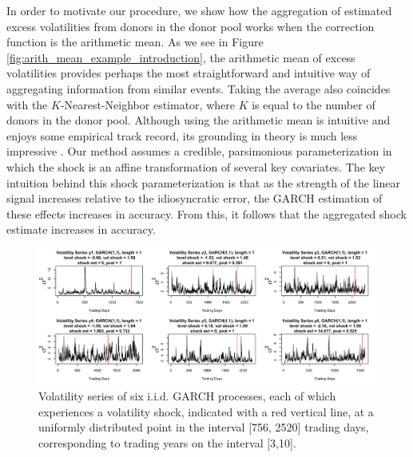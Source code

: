 \documentclass[11pt,3p,review,authoryear]{elsarticle}
\theoremstyle{definition}
\begin{document}
In order to motivate our procedure, we show how the aggregation of estimated excess volatilities from donors in the donor pool works when the correction function is the arithmetic mean.  As we see in Figure \ref{fig:arith_mean_example_introduction}, the arithmetic mean of excess volatilities provides perhaps the most straightforward and intuitive way of aggregating information from similar events.  Taking the average also coincides with the $K$-Nearest-Neighbor estimator, where $K$ is equal to the number of donors in the donor pool. Although using the arithmetic mean is intuitive and enjoys some empirical track record, its grounding in theory is much less impressive \citep{timmermann2006forecast}.  Our method assumes a credible, parsimonious parameterization in which the shock is an affine transformation of several key covariates.  The key intuition behind this shock parameterization is that as the strength of the linear signal increases relative to the idiosyncratic error, the GARCH estimation of these effects increases in accuracy.  From this, it follows that the aggregated shock estimate increases in accuracy.

\begin{figure}[h]
  \begin{center}
    \includegraphics[scale=.4]{simulation_plots/vol_series_six_plots.png}
    \caption{Volatility series of six i.i.d. GARCH processes, each of which experiences a volatility shock, indicated with a red vertical line, at a uniformly distributed point in the interval [756, 2520] trading days, corresponding to trading years on the interval [3,10].} 
    \label{fig:six_plots}
    \end{center}
  \end{figure}
\end{document}
